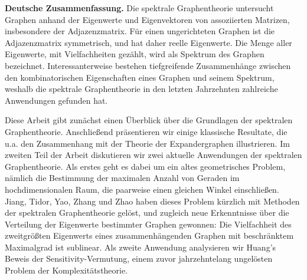 \begin{abstractframe}
    \setlength{\parindent}{1em}
    \footnotesize
    \noindent \textbf{Deutsche Zusammenfassung.}
    Die spektrale Graphentheorie untersucht Graphen anhand der Eigenwerte und Eigenvektoren von assoziierten Matrizen, insbesondere der Adjazenzmatrix.
    Für einen ungerichteten Graphen ist die Adjazenzmatrix symmetrisch, und hat daher reelle Eigenwerte. 
    Die Menge aller Eigenwerte, mit Vielfachheiten gezählt, wird als Spektrum des Graphen bezeichnet.
    Interessanterweise bestehen tiefgreifende Zusammenhänge zwischen den kombinatorischen Eigenschaften eines Graphen und seinem Spektrum, weshalb die spektrale Graphentheorie in den letzten Jahrzehnten zahlreiche Anwendungen gefunden hat.
    
    Diese Arbeit gibt zunächst einen Überblick über die Grundlagen der spektralen Graphentheorie. 
    Anschließend präsentieren wir einige klassische Resultate, die u.a. den Zusammenhang mit der Theorie der Expandergraphen illustrieren.
    Im zweiten Teil der Arbeit diskutieren wir zwei aktuelle Anwendungen der spektralen Graphentheorie.
    Als erstes geht es dabei um ein altes geometrisches Problem, nämlich die Bestimmung der maximalen Anzahl von Geraden im hochdimensionalen Raum, die paarweise einen gleichen Winkel einschließen.
    Jiang, Tidor, Yao, Zhang und Zhao haben dieses Problem kürzlich mit Methoden der spektralen Graphentheorie gelöst, und zugleich neue Erkenntnisse über die Verteilung der Eigenwerte bestimmter Graphen gewonnen:
    Die Vielfachheit des zweitgrößten Eigenwerts eines zusammenhängenden Graphen mit beschränktem Maximalgrad ist sublinear.
    Als zweite Anwendung analysieren wir Huang's Beweis der Sensitivity-Vermutung, einem zuvor jahrzehntelang ungelösten Problem der Komplexitätstheorie.
\end{abstractframe}

